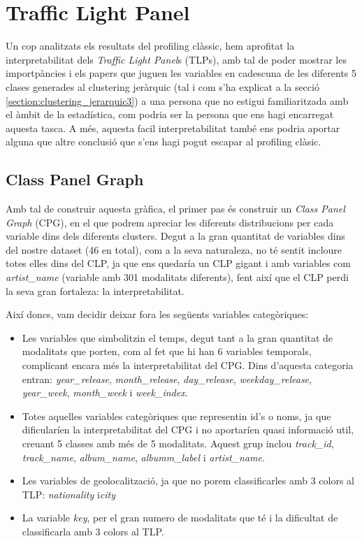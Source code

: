 \documentclass{article}
\begin{document}
\section{Traffic Light Panel }

Un cop analitzats els resultats del profiling clàssic, hem aprofitat la interpretabilitat dels \textit{Traffic Light Panel}s (TLPs), amb tal de poder mostrar les importpàncies i els papers que juguen les variables en cadescuna de les diferents 5 clases generades al clustering jeràrquic (tal i com s'ha explicat a la secció \ref{section:clustering_jerarquic3}) a una persona que no estigui familiaritzada amb el àmbit de la estadística, com podria ser la persona que ens hagi encarregat aquesta tasca. A més, aquesta facil interpretabilitat també ens podria aportar alguna que altre conclusió que s'ens hagi pogut escapar al profiling clàsic.

\subsection{Class Panel Graph}

Amb tal de construir aquesta gràfica, el primer pas és construir un \textit{Class Panel Graph} (CPG), en el que podrem apreciar les diferents distribucions per cada variable dins dels diferents clusters. Degut a la gran quantitat de variables dins del nostre dataset (46 en total), com a la seva naturaleza, no té sentit incloure totes elles dins del CLP, ja que ens quedaría un CLP gigant i amb variables com \textit{artist\_name} (variable amb 301 modalitats diferents), fent així que el CLP perdi la seva gran fortaleza: la interpretabilitat.

Així doncs, vam decidir deixar fora les següents variables categòriques:

\begin{itemize}
    \item Les variables que simbolitzin el temps, degut tant a la gran quantitat de modalitats que porten, com al fet que hi han 6 variables temporals, complicant encara més la interpretabilitat del CPG. Dins d'aquesta categoria entran: \textit{year\_release}, \textit{month\_release}, \textit{day\_release}, \textit{weekday\_release}, \textit{year\_week}, \textit{month\_week} i \textit{week\_index}.
    
    \item Totes aquelles variables categòriques que representin id's o noms, ja que dificularíen la interpretabilitat del CPG i no aportaríen quasi informació util, creuant 5 classes amb més de 5 modalitats. Aquest grup inclou \textit{track\_id}, \textit{track\_name},\textit{ album\_name}, \textit{albumm\_label} i \textit{artist\_name}.

    \item Les variables de geolocalització, ja que no porem classificarles amb 3 colors al TLP: \textit{nationality} i\textit{city}

    \item La variable \textit{key}, per el gran numero de modalitats que té i la dificultat de classificarla amb 3 colors al TLP.
\end{itemize}
\end{document}
